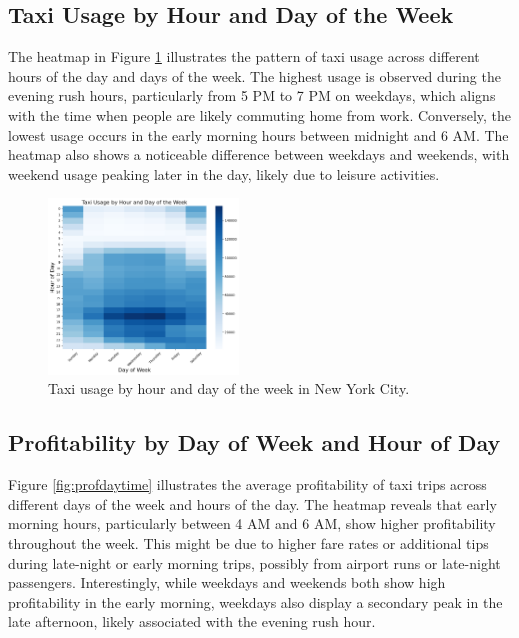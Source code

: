 \documentclass[11pt]{article}
\begin{document}
\subsection{Taxi Usage by Hour and Day of the Week}
The heatmap in Figure \ref{fig:usage_day_time} illustrates the pattern of taxi usage across different hours of the day and days of the week. The highest usage is observed during the evening rush hours, particularly from 5 PM to 7 PM on weekdays, which aligns with the time when people are likely commuting home from work. Conversely, the lowest usage occurs in the early morning hours between midnight and 6 AM. The heatmap also shows a noticeable difference between weekdays and weekends, with weekend usage peaking later in the day, likely due to leisure activities.

\pagebreak

\begin{figure}[h]
    \centering
    \vspace{-5mm} %
    \includegraphics[width=0.45\textwidth]{plots/usage_day_time.png} %
    \caption{Taxi usage by hour and day of the week in New York City.}
    \label{fig:usage_day_time}
    \vspace{-5mm} %
\end{figure}

\subsection{Profitability by Day of Week and Hour of Day}
Figure \ref{fig:profdaytime} illustrates the average profitability of taxi trips across different days of the week and hours of the day. The heatmap reveals that early morning hours, particularly between 4 AM and 6 AM, show higher profitability throughout the week. This might be due to higher fare rates or additional tips during late-night or early morning trips, possibly from airport runs or late-night passengers. Interestingly, while weekdays and weekends both show high profitability in the early morning, weekdays also display a secondary peak in the late afternoon, likely associated with the evening rush hour.
\end{document}
